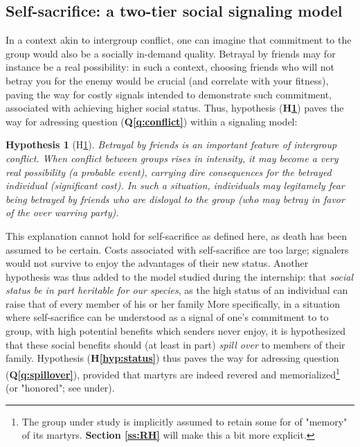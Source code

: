 \documentclass[a4paper,12pt]{report}
\newtheorem{hyp}{Hypothesis}
\begin{document}
\subsection{Self-sacrifice: a two-tier social signaling model}

In a context akin to intergroup conflict, one can imagine that commitment to the group
would also be a socially in-demand quality. Betrayal by friends may for instance be a
real possibility: in such a context, choosing friends who will not betray you for the
enemy would be crucial (and correlate with your fitness), paving the way for costly signals
intended to demonstrate such commitment, associated with achieving higher social status.
Thus, hypothesis (\textbf{H\ref{hyp:conflict}}) paves the way for adressing 
question (\textbf{Q\ref{q:conflict}}) within a signaling model:

\begin{hyp}[H\ref{hyp:conflict}] \label{hyp:conflict}
    Betrayal by friends is an important feature of intergroup conflict.
    When conflict between groups rises in intensity,
    it may become a very real possibility (a probable event),
    carrying dire consequences for the betrayed individual (significant cost).
    In such a situation, individuals may legitamely fear being betrayed 
    by friends who are disloyal to the group (who may betray in favor
    of the over warring party).
    \end{hyp}

This explanation cannot hold for self-sacrifice as defined here, as death has been assumed
to be certain. Costs associated with self-sacrifice are too large; signalers would not
survive to enjoy the advantages of their new status.
Another hypothesis was thus added to the model studied during the internship:
that \emph{social status be in part heritable for our species},
as the high status of an individual can raise that of every member of his or her family
More specifically, in a situation where self-sacrifice can be
understood as a signal of one’s commitment to to group,
with high potential benefits which senders never enjoy,
it is hypothesized that these social benefits should (at least in part)
\emph{spill over} to members of their family. Hypothesis (\textbf{H\ref{hyp:status}})
thus paves the way for adressing question (\textbf{Q\ref{q:spillover}}),
provided that martyrs are indeed revered and memorialized\footnote{
    The group under study is implicitly assumed to retain
    some for of "memory" of its martyrs. \textbf{Section \ref{ss:RH}}
    will make this a bit more explicit.}
(or "honored"; see under).
\end{document}
